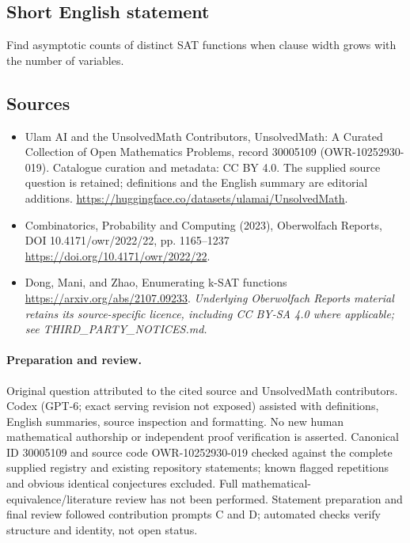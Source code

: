 \documentclass[11pt]{article}
\begin{document}
\subsection{Short English statement}
Find asymptotic counts of distinct SAT functions when clause width grows with the number of variables.
\subsection{Sources}
\begin{itemize}
\item[\hypertarget{source:30005109:1}{S1}] Ulam AI and the UnsolvedMath Contributors, UnsolvedMath: A Curated Collection of Open Mathematics Problems, record 30005109 (OWR-10252930-019). Catalogue curation and metadata: CC BY 4.0. The supplied source question is retained; definitions and the English summary are editorial additions.
\url{https://huggingface.co/datasets/ulamai/UnsolvedMath}.
\item[\hypertarget{source:30005109:2}{S2}] Combinatorics, Probability and Computing (2023), Oberwolfach Reports, DOI 10.4171/owr/2022/22, pp. 1165--1237
\url{https://doi.org/10.4171/owr/2022/22}.
\item[\hypertarget{source:30005109:3}{S3}] Dong, Mani, and Zhao, Enumerating k-SAT functions
\url{https://arxiv.org/abs/2107.09233}.
\textit{Underlying Oberwolfach Reports material retains its source-specific licence, including CC BY-SA 4.0 where applicable; see THIRD\_PARTY\_NOTICES.md.}
\end{itemize}
\paragraph{Preparation and review.}
Original question attributed to the cited source and UnsolvedMath contributors. Codex (GPT-6; exact serving revision not exposed) assisted with definitions, English summaries, source inspection and formatting. No new human mathematical authorship or independent proof verification is asserted. Canonical ID 30005109 and source code OWR-10252930-019 checked against the complete supplied registry and existing repository statements; known flagged repetitions and obvious identical conjectures excluded. Full mathematical-equivalence/literature review has not been performed. Statement preparation and final review followed contribution prompts C and D; automated checks verify structure and identity, not open status.
\label{end:30005109}
\end{document}
